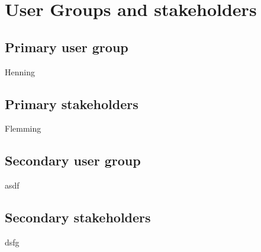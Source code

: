 \section{User Groups and stakeholders}
\subsection{Primary user group}
Henning

\subsection{Primary stakeholders}
Flemming

\subsection{Secondary user group}
asdf

\subsection{Secondary stakeholders}
dsfg
